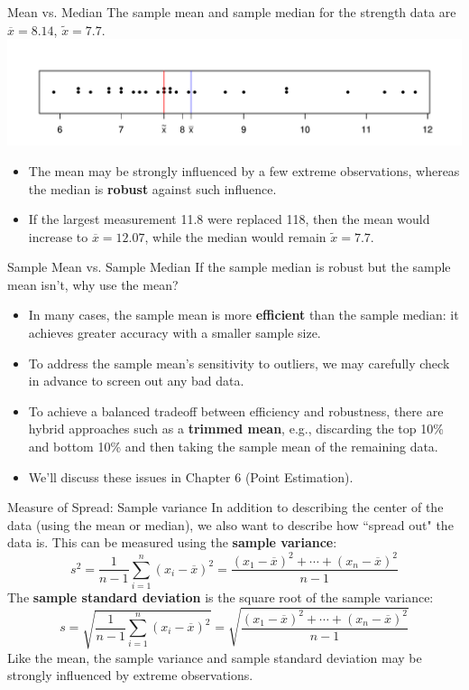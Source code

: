 \documentclass{beamer}
\renewcommand{\emph}{\textbf}
\begin{document}
\begin{frame}{Mean vs. Median}
The sample mean and sample median for the strength data are $\overline{x}=8.14$, $\tilde{x}=7.7$.
\includegraphics[scale=.5]{ch01_strength_dot_mm.pdf}
\begin{itemize}
\item The mean may be strongly influenced by a few extreme observations, whereas the median is \emph{robust} against such influence. 
\item If the largest measurement 11.8 were replaced 118, then the mean would increase to $\overline{x}=12.07$, while the median would remain $\tilde{x}=7.7$. 
\end{itemize}
\end{frame}

\begin{frame}{Sample Mean vs. Sample Median}
If the sample median is robust but the sample mean isn't, why use the mean?
\begin{itemize}
\pause\item In many cases, the sample mean is more \emph{efficient} than the sample median: it achieves greater accuracy with a smaller sample size.
\pause\item To address the sample mean's sensitivity to outliers, we may carefully check in advance to screen out any bad data.
\pause\item To achieve a balanced tradeoff between efficiency and robustness, there are hybrid approaches such as a \emph{trimmed mean}, e.g., discarding the top 10\% and bottom 10\% and then taking the sample mean of the remaining data.
\pause\item We'll discuss these issues in Chapter 6 (Point Estimation).
\end{itemize}

\end{frame}

\begin{frame}{Measure of Spread: Sample variance}
In addition to describing the center of the data (using the mean or median), we also want to describe how ``spread out" the data is. This can be measured using the \emph{sample variance}:
$$s^2 = \frac1{n-1}\sum_{i=1}^n(x_i-\overline{x})^2 = \frac{(x_1-\overline{x})^2+\cdots+(x_n-\overline{x})^2}{n-1}$$
\pause
The \emph{sample standard deviation} is the square root of the sample variance:
$$s = \sqrt{\frac1{n-1}\sum_{i=1}^n(x_i-\overline{x})^2} = \sqrt{\frac{(x_1-\overline{x})^2+\cdots+(x_n-\overline{x})^2}{n-1}}$$
\pause
Like the mean, the sample variance and sample standard deviation may be strongly influenced by extreme observations.
\end{frame}
\end{document}
